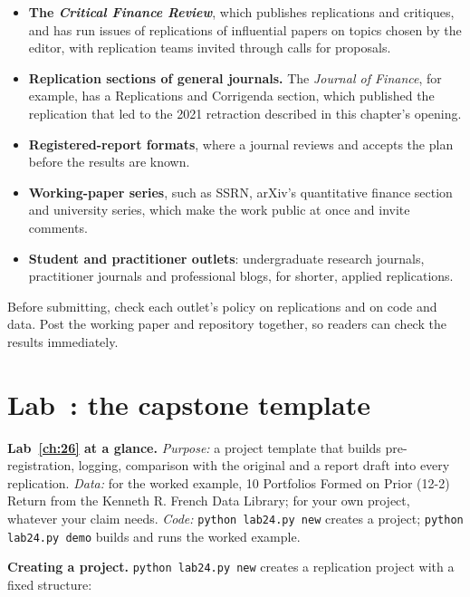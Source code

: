 \begin{itemize}
  \item \textbf{The \emph{Critical Finance Review}}, which publishes replications and critiques, and has run issues of replications of influential papers on topics chosen by the editor, with replication teams invited through calls for proposals.
  \item \textbf{Replication sections of general journals.} The \emph{Journal of Finance}, for example, has a Replications and Corrigenda section, which published the replication that led to the 2021 retraction described in this chapter's opening.
  \item \textbf{Registered-report formats}, where a journal reviews and accepts the plan before the results are known.
  \item \textbf{Working-paper series}, such as SSRN, arXiv's quantitative finance section and university series, which make the work public at once and invite comments.
  \item \textbf{Student and practitioner outlets}: undergraduate research journals, practitioner journals and professional blogs, for shorter, applied replications.
\end{itemize}

Before submitting, check each outlet's policy on replications and on code and data. Post the working paper and repository together, so readers can check the results immediately.

\section{Lab~\thechapter: the capstone template}
\label{sec:26-lab}

\begin{callout}
\textbf{Lab~\ref{ch:26} at a glance.} \emph{Purpose:} a project template that builds pre-registration, logging, comparison with the original and a report draft into every replication. \emph{Data:} for the worked example, 10 Portfolios Formed on Prior (12-2) Return from the Kenneth R. French Data Library; for your own project, whatever your claim needs. \emph{Code:} \texttt{python lab24.py new} creates a project; \texttt{python lab24.py demo} builds and runs the worked example.
\end{callout}

\textbf{Creating a project.} \texttt{python lab24.py new} creates a replication project with a fixed structure:

